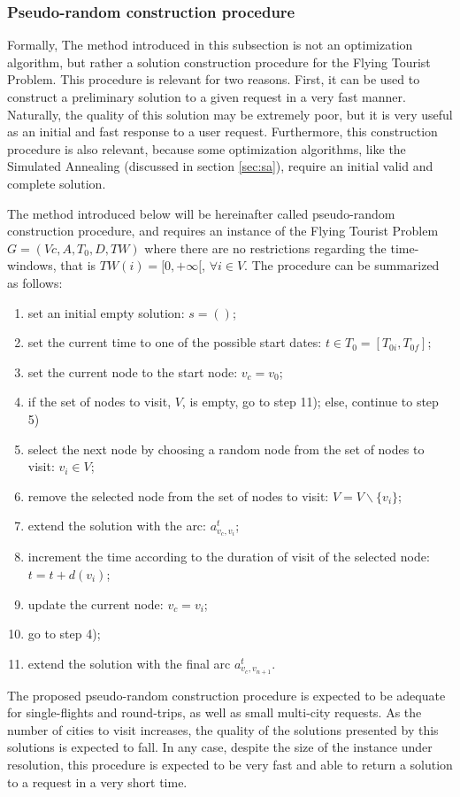 \subsubsection{Pseudo-random construction procedure}
\label{sec:pseudo_random}

Formally, The method introduced in this subsection is not an optimization algorithm, but rather a solution construction procedure for the Flying Tourist Problem. This procedure is relevant for two reasons. First, it can be used to construct a preliminary solution to a given request in a very fast manner. Naturally, the quality of this solution may be extremely poor, but it is very useful as an initial and fast response to a user request. Furthermore, this construction procedure is also relevant, because some optimization algorithms, like the Simulated Annealing (discussed in section \ref{sec:sa}), require an initial valid and complete solution.

The method introduced below will be hereinafter called pseudo-random construction procedure, and requires an instance of the Flying Tourist Problem $G=(Vc,A,T_0,D,TW)$ where there are no restrictions regarding the time-windows, that is $TW(i) = [0, +\infty[$, $\forall i \in V$. The procedure can be summarized as follows:

\begin{enumerate}
\itemsep0em 
    \item set an initial empty solution: $s=()$;
    \item set the current time to one of the possible start dates: $t \in T_0=[T_{0i}, T_{0f}]$;
    \item set the current node to the start node: $v_c = v_0$;
    \item if the set of nodes to visit, $V$, is empty, go to step 11); else, continue to step 5)
    \item select the next node by choosing a random node from the set of nodes to visit: $v_i \in V$;
    \item remove the selected node from the set of nodes to visit: $V=V\backslash\{v_i\}$;
    \item extend the solution with the arc: $a_{v_c, v_i}^t$;
    \item increment the time according to the duration of visit of the selected node: $t=t+d(v_i)$;
    \item update the current node: $v_c=v_i$;
    \item go to step 4);
    \item extend the solution with the final arc $a_{v_c, v_{n+1}}^t$.
\end{enumerate}

The proposed pseudo-random construction procedure is expected to be adequate for single-flights and round-trips, as well as small multi-city requests. As the number of cities to visit increases, the quality of the solutions presented by this solutions is expected to fall. In any case, despite the size of the instance under resolution, this procedure is expected to be very fast and able to return a solution to a request in a very short time.